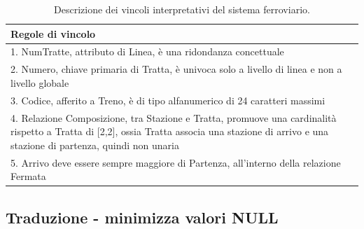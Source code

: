 \documentclass{article}
\begin{document}
\begin{table}[ht]
    \centering
    \begin{tabular}{|p{12cm}|}
        \hline
        Regole di vincolo \\
        \hline
        1. NumTratte, attributo di Linea, è una ridondanza concettuale \\
        \hline
        2. Numero, chiave primaria di Tratta, è univoca solo a livello di linea e non a livello globale \\
        \hline
        3. Codice, afferito a Treno, è di tipo alfanumerico di 24 caratteri massimi \\
        \hline
        4. Relazione Composizione, tra Stazione e Tratta, promuove una cardinalità rispetto a Tratta di [2,2], ossia Tratta associa una stazione di arrivo e una stazione di partenza, quindi non unaria \\
        \hline
        5. Arrivo deve essere sempre maggiore di Partenza, all'interno della relazione Fermata \\
        \hline
    \end{tabular}
    \caption{Descrizione dei vincoli interpretativi del sistema ferroviario.}
\end{table}

\pagebreak
\subsection*{Traduzione - minimizza valori NULL}
\end{document}
